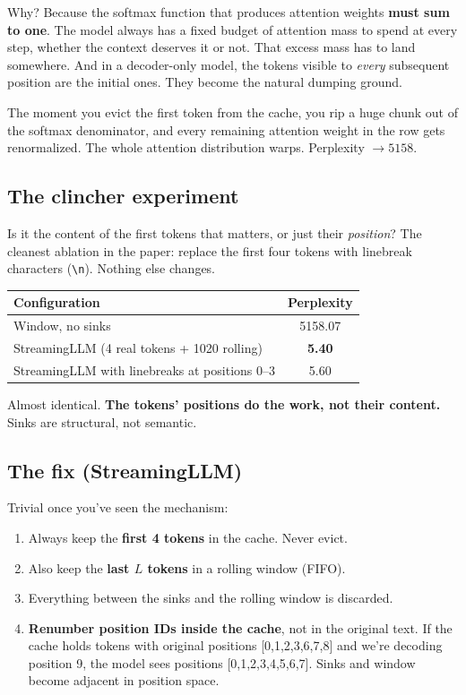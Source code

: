 \documentclass[11pt,a4paper]{article}
\begin{document}
Why? Because the softmax function that produces attention weights
\textbf{must sum to one}. The model always has a fixed budget of attention
mass to spend at every step, whether the context deserves it or not. That
excess mass has to land somewhere. And in a decoder-only model, the tokens
visible to \emph{every} subsequent position are the initial ones. They
become the natural dumping ground.

The moment you evict the first token from the cache, you rip a huge chunk
out of the softmax denominator, and every remaining attention weight in
the row gets renormalized. The whole attention distribution warps.
Perplexity $\to 5158$.

\subsection{The clincher experiment}
Is it the content of the first tokens that matters, or just their
\emph{position}? The cleanest ablation in the paper: replace the first
four tokens with linebreak characters (\texttt{\textbackslash n}). Nothing
else changes.

\begin{center}
\begin{tabular}{lc}
\toprule
\textbf{Configuration} & \textbf{Perplexity} \\
\midrule
Window, no sinks                                & 5158.07 \\
StreamingLLM (4 real tokens + 1020 rolling)     & \textbf{5.40} \\
StreamingLLM with linebreaks at positions 0--3  & 5.60 \\
\bottomrule
\end{tabular}
\end{center}

Almost identical. \textbf{The tokens' positions do the work, not their
content.} Sinks are structural, not semantic.

\subsection{The fix (StreamingLLM)}
Trivial once you've seen the mechanism:
\begin{enumerate}[leftmargin=1.5em,itemsep=0.1em]
  \item Always keep the \textbf{first 4 tokens} in the cache. Never evict.
  \item Also keep the \textbf{last $L$ tokens} in a rolling window (FIFO).
  \item Everything between the sinks and the rolling window is discarded.
  \item \textbf{Renumber position IDs inside the cache}, not in the
        original text. If the cache holds tokens with original positions
        [0,1,2,3,6,7,8] and we're decoding position 9, the model sees
        positions [0,1,2,3,4,5,6,7]. Sinks and window become adjacent
        in position space.
\end{enumerate}
\end{document}
